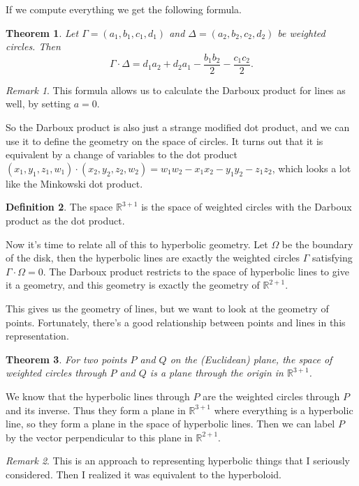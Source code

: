 \documentclass{article}
\newtheorem{thm}{Theorem}
\theoremstyle{definition}
\newtheorem{defn}[thm]{Definition}
\theoremstyle{remark}
\newtheorem*{rmk}{Remark}
\newenvironment{aside}{\renewcommand{\thesection}{(\textit{\arabic{section}})}\renewcommand{\thesubsection}{(\textit{\arabic{section}.\arabic{subsection}})}}{\renewcommand{\thesection}{\arabic{section}}\renewcommand{\thesubsection}{\arabic{section}.\arabic{subsection}}}
\begin{document}
\begin{aside}
If we compute everything we get the following formula.
\begin{thm}
    Let $\Gamma=(a_1,b_1,c_1,d_1)$ and $\Delta=(a_2,b_2,c_2,d_2)$ be weighted circles. Then
    \[\Gamma\cdot\Delta=d_1a_2+d_2a_1-\frac{b_1b_2}2-\frac{c_1c_2}2.\]
\end{thm}
\begin{rmk}
    This formula allows us to calculate the Darboux product for lines as well, by setting $a=0$.
\end{rmk}

So the Darboux product is also just a strange modified dot product, and we can use it to define the geometry on the space of circles. It turns out that it is equivalent by a change of variables to the dot product $(x_1,y_1,z_1,w_1)\cdot(x_2,y_2,z_2,w_2)=w_1w_2-x_1x_2-y_1y_2-z_1z_2$, which looks a lot like the Minkowski dot product.
\begin{defn}
    The space $\mathbb R^{3+1}$ is the space of weighted circles with the Darboux product as the dot product.
\end{defn}

Now it's time to relate all of this to hyperbolic geometry. Let $\Omega$ be the boundary of the disk, then the hyperbolic lines are exactly the weighted circles $\Gamma$ satisfying $\Gamma\cdot\Omega=0$. The Darboux product restricts to the space of hyperbolic lines to give it a geometry, and this geometry is exactly the geometry of $\mathbb R^{2+1}$.

This gives us the geometry of lines, but we want to look at the geometry of points. Fortunately, there's a good relationship between points and lines in this representation.
\begin{thm}
    For two points $P$ and $Q$ on the (Euclidean) plane, the space of weighted circles through $P$ and $Q$ is a plane through the origin in $\mathbb R^{3+1}$.
\end{thm}
We know that the hyperbolic lines through $P$ are the weighted circles through $P$ and its inverse. Thus they form a plane in $\mathbb R^{3+1}$ where everything is a hyperbolic line, so they form a plane in the space of hyperbolic lines. Then we can label $P$ by the vector perpendicular to this plane in $\mathbb R^{2+1}$.

\begin{rmk}
    This is an approach to representing hyperbolic things that I seriously considered. Then I realized it was equivalent to the hyperboloid.
\end{rmk}
\end{aside}
\end{document}
